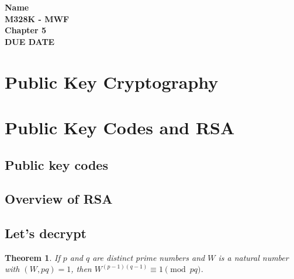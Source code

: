 \documentclass[11pt,leqno]{article}
\newtheorem{thm}{Theorem}[section]
\theoremstyle{definition}
\begin{document}
\thispagestyle{plain}
\begin{flushright}
\large{\textbf{Name \\
M328K - MWF \\
Chapter 5\\
DUE DATE \\}}
\end{flushright}



\setcounter{tocdepth}{3}




\setcounter{section}{4}

\setcounter{thm}{0}


\section{Public Key Cryptography}


\section*{Public Key Codes and RSA}


\subsection*{Public key codes}


\subsection*{Overview of RSA}

\subsection*{Let's decrypt}


\begin{thm}
If $p$ and $q$ are distinct prime numbers and $W$ is a natural
number with $(W, pq)=1$, then $W^{(p-1)(q-1)}\equiv 1 \pmod{pq}$.
\end{thm}
\end{document}
